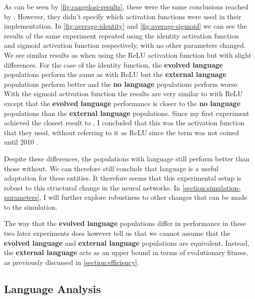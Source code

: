 \documentclass[12pt,a4paper]{report}
\begin{document}
As can be seen by \cref{fig:cangelosi-results}, these were the same conclusions reached by \citet{Cangelosi1998}. However, they didn't specify which activation functions were used in their implementation. In \cref{fig:average-identity} and \ref{fig:average-sigmoid} we can see the results of the same experiment repeated using the identity activation function and sigmoid activation function respectively, with no other parameters changed. We see similar results as when using the ReLU activation function but with slight differences. For the case of the identity function, the {\bf evolved language} populations perform the same as with ReLU but the {\bf external language} populations perform better and the {\bf no language} populations perform worse. With the sigmoid activation function the results are very similar to with ReLU except that the {\bf evolved language} performance is closer to the {\bf no language} populations than the {\bf external language} populations. Since my first experiment achieved the closest result to \citet{Cangelosi1998}, I concluded that this was the activation function that they used, without referring to it as ReLU since the term was not coined until 2010 \citep{nair2010rectified}.

Despite these differences, the populations with language still perform better than those without. We can therefore still conclude that language is a useful adaptation for these entities. It therefore seems that this experimental setup is robust to this structural change in the neural networks. In \cref{section:simulation-parameters}, I will further explore robustness to other changes that can be made to the simulation.

The way that the {\bf evolved language} populations differ in performance in these two later experiments does however tell us that we cannot assume that the {\bf evolved language} and {\bf external language} populations are equivalent. Instead, the {\bf external language} acts as an upper bound in terms of evolutionary fitness, as previously discussed in \cref{section:efficiency}. %


\subsection{Language Analysis}\label{section:languageanalysis}
\end{document}
